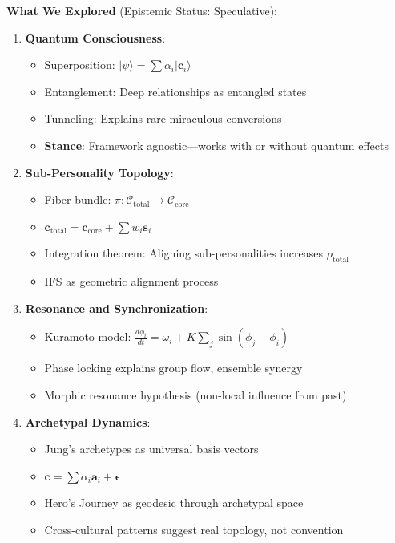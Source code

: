 \documentclass[11pt,a4paper]{article}
\theoremstyle{definition}
\theoremstyle{remark}
\newcommand{\CC}{\mathcal{C}}
\newcommand{\cc}{\mathbf{c}}
\begin{document}
\begin{small}
\begin{enumerate}
\begin{mdframed}[backgroundcolor=green!10,linewidth=2pt,linecolor=green!70!black]
\textbf{What We Explored} (Epistemic Status: Speculative):

\begin{enumerate}[nosep]
    \item \textbf{Quantum Consciousness}:
        \begin{itemize}[nosep]
            \item Superposition: \(|\psi\rangle = \sum \alpha_i|\cc_i\rangle\)
            \item Entanglement: Deep relationships as entangled states
            \item Tunneling: Explains rare miraculous conversions
            \item \textbf{Stance}: Framework agnostic—works with or without quantum effects
        \end{itemize}
    
    \item \textbf{Sub-Personality Topology}:
        \begin{itemize}[nosep]
            \item Fiber bundle: \(\pi: \CC_{\text{total}} \to \CC_{\text{core}}\)
            \item \(\cc_{\text{total}} = \cc_{\text{core}} + \sum w_i \mathbf{s}_i\)
            \item Integration theorem: Aligning sub-personalities increases \(\rho_{\text{total}}\)
            \item IFS as geometric alignment process
        \end{itemize}
    
    \item \textbf{Resonance and Synchronization}:
        \begin{itemize}[nosep]
            \item Kuramoto model: \(\frac{d\phi_i}{dt} = \omega_i + K\sum_j \sin(\phi_j - \phi_i)\)
            \item Phase locking explains group flow, ensemble synergy
            \item Morphic resonance hypothesis (non-local influence from past)
        \end{itemize}
    
    \item \textbf{Archetypal Dynamics}:
        \begin{itemize}[nosep]
            \item Jung's archetypes as universal basis vectors
            \item \(\cc = \sum \alpha_i \mathbf{a}_i + \boldsymbol{\epsilon}\)
            \item Hero's Journey as geodesic through archetypal space
            \item Cross-cultural patterns suggest real topology, not convention
        \end{itemize}
\end{enumerate}


\end{mdframed}
\end{enumerate}
\end{small}
\end{document}
